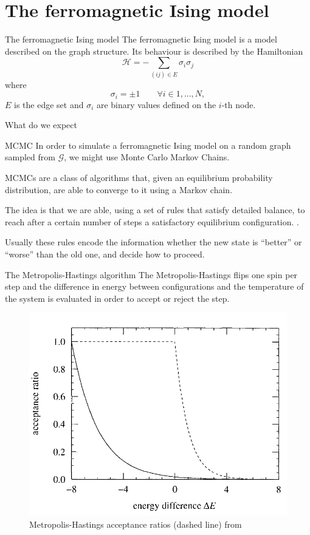 \documentclass[handout]{beamer}
\begin{document}
\section{The ferromagnetic Ising model}

\begin{frame}{The ferromagnetic Ising model}
    The \alert{ferromagnetic Ising model} is a model described on the graph
    structure. Its behaviour is described by the Hamiltonian
    \begin{equation}
        \mathcal{H} = -\sum_{(ij)\in E} \sigma_i \sigma_j
        \label{eq:ferroising_ham}
    \end{equation}
    where
    $$
        \sigma_i = \pm 1 \qquad \forall i \in 1, ..., N,
    $$
    $E$ is the edge set and $\sigma_i$ are binary values defined on the $i$-th
    node.
\end{frame}

\begin{frame}{What do we expect}
\end{frame}

\begin{frame}{MCMC}
    In order to simulate a ferromagnetic Ising model on a random graph sampled
    from $\mathcal{G}$, we might use \alert{Monte Carlo Markov Chains}.

    MCMCs are a class of algorithms that, given an equilibrium probability
    distribution, are able to converge to it using a Markov chain.

    The idea is that we are able, using a set of rules that satisfy detailed
    balance, to reach after a certain number of steps a satisfactory
    equilibrium configuration. \cite[31-42]{newman_barkema}.

    Usually these rules encode the information whether the new state is
    ``better'' or ``worse'' than the old one, and decide how to proceed.
\end{frame}

\begin{frame}{The Metropolis-Hastings algorithm}
    The \alert{Metropolis-Hastings} flips one spin per step and the difference
    in energy between configurations and the temperature of the system is
    evaluated in order to accept or reject the step. \cite[46]{newman_barkema}

    \begin{figure}
        \centering
        \includegraphics[width=.4\textwidth]{metropolis_acceptance.png}
        \caption{Metropolis-Hastings acceptance ratios (dashed line) from
        \cite[48]{newman_barkema}}
    \end{figure}
\end{frame}
\end{document}
